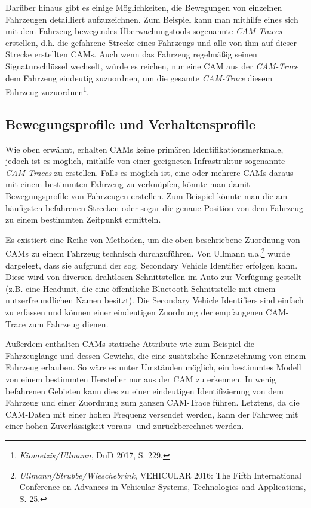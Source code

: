 Darüber hinaus gibt es einige Möglichkeiten, die Bewegungen von einzelnen Fahrzeugen detailliert aufzuzeichnen. Zum Beispiel kann man mithilfe eines sich mit dem Fahrzeug bewegendes Überwachungstools sogenannte \textit{CAM-Traces} erstellen, d.h. die gefahrene Strecke eines Fahrzeugs und alle von ihm auf dieser Strecke erstellten CAMs. Auch wenn das Fahrzeug regelmäßig seinen Signaturschlüssel wechselt, würde es reichen, nur eine CAM aus der \textit{CAM-Trace} dem Fahrzeug eindeutig zuzuordnen, um die gesamte \textit{CAM-Trace} diesem Fahrzeug zuzuordnen\footnote{\emph{Kiometzis/Ullmann}, DuD 2017, S. 229.}\nocite{Kiometzis2017}. 

\subsection{Bewegungsprofile und Verhaltensprofile}
\label{sec:SecondContentSection:SecondSubsection:FirstSubSubsection}

Wie oben erwähnt, erhalten CAMs keine primären Identifikationsmerkmale, jedoch ist es möglich, mithilfe von einer geeigneten Infrastruktur sogenannte \textit{CAM-Traces} zu erstellen. Falls es möglich ist, eine oder mehrere CAMs daraus mit einem bestimmten Fahrzeug zu verknüpfen, könnte man damit Bewegungsprofile von Fahrzeugen erstellen. Zum Beispiel könnte man die am häufigsten befahrenen Strecken oder sogar die genaue Position von dem Fahrzeug zu einem bestimmten Zeitpunkt ermitteln. 

Es existiert eine Reihe von Methoden, um die oben beschriebene Zuordnung von CAMs zu einem Fahrzeug technisch durchzuführen. Von Ullmann u.a.\footnote{\emph{Ullmann/Strubbe/Wieschebrink}, VEHICULAR 2016: The Fifth International Conference on Advances in Vehicular Systems, Technologies and Applications, S. 25.}\nocite{Ullmann2016} wurde dargelegt, dass sie aufgrund der sog. Secondary Vehicle Identifier erfolgen kann. Diese wird von diversen drahtlosen Schnittstellen im Auto zur Verfügung gestellt (z.B. eine Headunit, die eine öffentliche Bluetooth-Schnittstelle mit einem nutzerfreundlichen Namen besitzt). Die Secondary Vehicle Identifiers sind einfach zu erfassen und können einer eindeutigen Zuordnung der empfangenen CAM-Trace zum Fahrzeug dienen. 

Außerdem enthalten CAMs statische Attribute wie zum Beispiel die Fahrzeuglänge und dessen Gewicht, die eine zusätzliche Kennzeichnung von einem Fahrzeug erlauben. So wäre es unter Umständen möglich, ein bestimmtes Modell von einem bestimmten Hersteller nur aus der CAM zu erkennen. In wenig befahrenen Gebieten kann dies zu einer eindeutigen Identifizierung von dem Fahrzeug und einer Zuordnung zum ganzen CAM-Trace führen. Letztens, da die CAM-Daten mit einer hohen Frequenz versendet werden, kann der Fahrweg mit einer hohen Zuverlässigkeit voraus- und zurückberechnet werden. 

